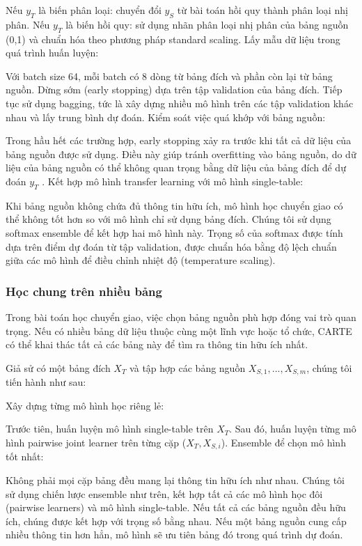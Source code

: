 \documentclass{article}
\begin{document}
Nếu $y_T$ là biến phân loại: chuyển đổi $y_S$ từ bài toán hồi quy thành phân loại nhị phân.
Nếu $y_T$ là biến hồi quy: sử dụng nhãn phân loại nhị phân của bảng nguồn ({0,1}) và chuẩn hóa theo phương pháp standard scaling.
Lấy mẫu dữ liệu trong quá trình huấn luyện:

Với batch size 64, mỗi batch có 8 dòng từ bảng đích và phần còn lại từ bảng nguồn.
Dừng sớm (early stopping) dựa trên tập validation của bảng đích.
Tiếp tục sử dụng bagging, tức là xây dựng nhiều mô hình trên các tập validation khác nhau và lấy trung bình dự đoán.
Kiểm soát việc quá khớp với bảng nguồn:

Trong hầu hết các trường hợp, early stopping xảy ra trước khi tất cả dữ liệu của bảng nguồn được sử dụng.
Điều này giúp tránh overfitting vào bảng nguồn, do dữ liệu của bảng nguồn có thể không quan trọng bằng dữ liệu của bảng đích để dự đoán $y_T$ .
Kết hợp mô hình transfer learning với mô hình single-table:

Khi bảng nguồn không chứa đủ thông tin hữu ích, mô hình học chuyển giao có thể không tốt hơn so với mô hình chỉ sử dụng bảng đích.
Chúng tôi sử dụng softmax ensemble để kết hợp hai mô hình này. Trọng số của softmax được tính dựa trên điểm dự đoán từ tập validation, được chuẩn hóa bằng độ lệch chuẩn giữa các mô hình để điều chỉnh nhiệt độ (temperature scaling).

\subsubsection{Học chung trên nhiều bảng}
Trong bài toán học chuyển giao, việc chọn bảng nguồn phù hợp đóng vai trò quan trọng. Nếu có nhiều bảng dữ liệu thuộc cùng một lĩnh vực hoặc tổ chức, CARTE có thể khai thác tất cả các bảng này để tìm ra thông tin hữu ích nhất.

Giả sử có một bảng đích $X_T$ và tập hợp các bảng nguồn ${X_{S,1}, ..., X_{S,m}}$, chúng tôi tiến hành như sau:

Xây dựng từng mô hình học riêng lẻ:

Trước tiên, huấn luyện mô hình single-table trên $X_T$.
Sau đó, huấn luyện từng mô hình pairwise joint learner trên từng cặp ($X_T, X_{S,i}$).
Ensemble để chọn mô hình tốt nhất:

Không phải mọi cặp bảng đều mang lại thông tin hữu ích như nhau.
Chúng tôi sử dụng chiến lược ensemble như trên, kết hợp tất cả các mô hình học đôi (pairwise learners) và mô hình single-table.
Nếu tất cả các bảng nguồn đều hữu ích, chúng được kết hợp với trọng số bằng nhau.
Nếu một bảng nguồn cung cấp nhiều thông tin hơn hẳn, mô hình sẽ ưu tiên bảng đó trong quá trình dự đoán.
\end{document}
